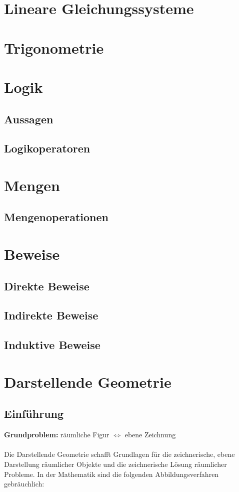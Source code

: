 \documentclass[12pt,a4paper]{scrbook}
\begin{document}
\chapter{Lineare Gleichungssysteme}

\chapter{Trigonometrie}

\chapter{Logik}
\section{Aussagen}
\section{Logikoperatoren}

\chapter{Mengen}
\section{Mengenoperationen}

\chapter{Beweise}
\section{Direkte Beweise}

\section{Indirekte Beweise}

\section{Induktive Beweise}

\chapter{Darstellende Geometrie}
\section{Einführung}
\textbf{Grundproblem:} räumliche Figur $\Leftrightarrow$ ebene Zeichnung \\\\
Die Darstellende Geometrie schafft Grundlagen für die zeichnerische, ebene Darstellung räumlicher Objekte
und die zeichnerische Lösung räumlicher Probleme. In der Mathematik sind die
folgenden Abbildungsverfahren gebräuchlich:
\end{document}
